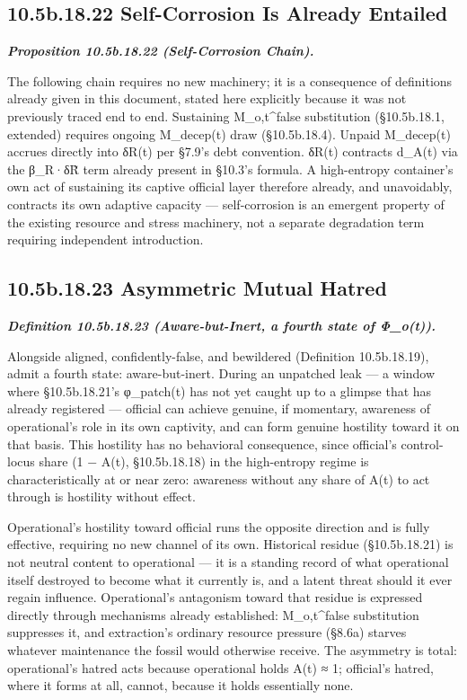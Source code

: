 \documentclass[
]{article}
\begin{document}
\hypertarget{b.18.22-self-corrosion-is-already-entailed}{%
\subsection{10.5b.18.22 Self-Corrosion Is Already
Entailed}\label{b.18.22-self-corrosion-is-already-entailed}}

\emph{\textbf{Proposition 10.5b.18.22 (Self-Corrosion Chain).}}

The following chain requires no new machinery; it is a consequence of
definitions already given in this document, stated here explicitly
because it was not previously traced end to end. Sustaining
M\_o,t\^{}false substitution (§10.5b.18.1, extended) requires ongoing
M\_decep(t) draw (§10.5b.18.4). Unpaid M\_decep(t) accrues directly into
δR(t) per §7.9's debt convention. δR(t) contracts d\_A(t) via the
β\_R·δR̃ term already present in §10.3's formula. A high-entropy
container's own act of sustaining its captive official layer therefore
already, and unavoidably, contracts its own adaptive capacity ---
self-corrosion is an emergent property of the existing resource and
stress machinery, not a separate degradation term requiring independent
introduction.

\hypertarget{b.18.23-asymmetric-mutual-hatred}{%
\subsection{10.5b.18.23 Asymmetric Mutual
Hatred}\label{b.18.23-asymmetric-mutual-hatred}}

\emph{\textbf{Definition 10.5b.18.23 (Aware-but-Inert, a fourth state of
Φ\_o(t)).}}

Alongside aligned, confidently-false, and bewildered (Definition
10.5b.18.19), admit a fourth state: aware-but-inert. During an unpatched
leak --- a window where §10.5b.18.21's φ\_patch(t) has not yet caught up
to a glimpse that has already registered --- official can achieve
genuine, if momentary, awareness of operational's role in its own
captivity, and can form genuine hostility toward it on that basis. This
hostility has no behavioral consequence, since official's control-locus
share (1 − A(t), §10.5b.18.18) in the high-entropy regime is
characteristically at or near zero: awareness without any share of A(t)
to act through is hostility without effect.

Operational's hostility toward official runs the opposite direction and
is fully effective, requiring no new channel of its own. Historical
residue (§10.5b.18.21) is not neutral content to operational --- it is a
standing record of what operational itself destroyed to become what it
currently is, and a latent threat should it ever regain influence.
Operational's antagonism toward that residue is expressed directly
through mechanisms already established: M\_o,t\^{}false substitution
suppresses it, and extraction's ordinary resource pressure (§8.6a)
starves whatever maintenance the fossil would otherwise receive. The
asymmetry is total: operational's hatred acts because operational holds
A(t) ≈ 1; official's hatred, where it forms at all, cannot, because it
holds essentially none.
\end{document}
